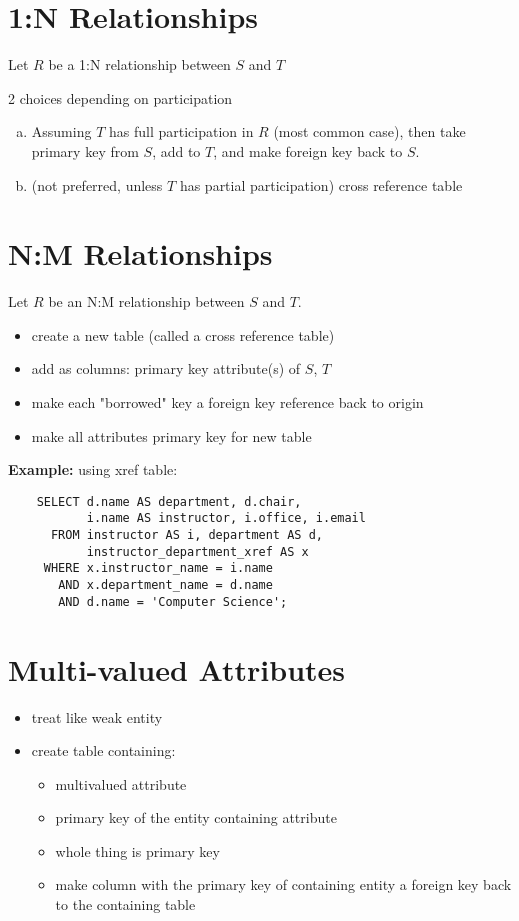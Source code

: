 \documentclass{../cheatsheet}
\begin{document}
\begin{multicols*}{2}
    \section{1:N Relationships}
    Let $R$ be a 1:N relationship between $S$ and $T$

    2 choices depending on participation
    \begin{enumerate}[(a)]
        \item Assuming $T$ has full participation in $R$ (most common case), then
            take primary key from $S$, add to $T$, and make foreign key back to $S$.
        \item (not preferred, unless $T$ has partial participation) cross reference
            table
    \end{enumerate}

    \section{N:M Relationships}
    Let $R$ be an N:M relationship between $S$ and $T$.
    \begin{itemize}
        \item create a new table (called a cross reference table)
        \item add as columns: primary key attribute(s) of $S$, $T$
        \item make each "borrowed" key a foreign key reference back to origin
        \item make all attributes primary key for new table
    \end{itemize}

    \textbf{Example:} using xref table:
    \begin{verbatim}
    SELECT d.name AS department, d.chair,
           i.name AS instructor, i.office, i.email
      FROM instructor AS i, department AS d,
           instructor_department_xref AS x
     WHERE x.instructor_name = i.name
       AND x.department_name = d.name
       AND d.name = 'Computer Science';
    \end{verbatim}

    \section{Multi-valued Attributes}
    \begin{itemize}
        \item treat like weak entity
        \item create table containing:
            \begin{itemize}
                \item multivalued attribute
                \item primary key of the entity containing attribute
                \item whole thing is primary key
                \item make column with the primary key of containing entity a
                    foreign key back to the containing table
            \end{itemize}
    \end{itemize}


\end{multicols*}
\end{document}
